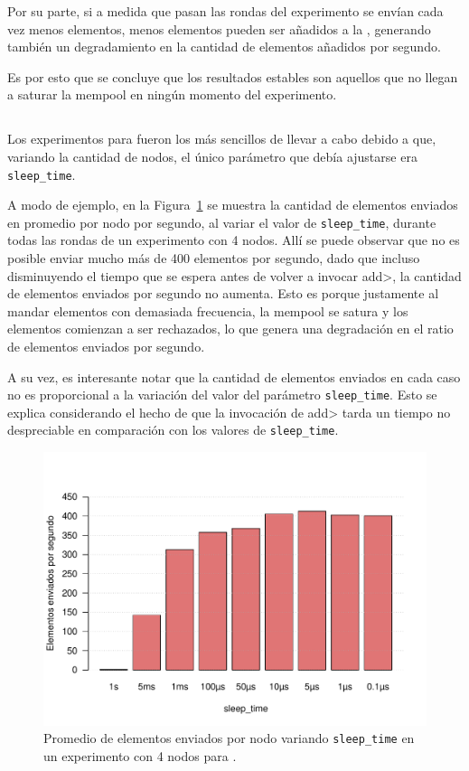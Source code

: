 Por su parte, si a medida que pasan las rondas del experimento se envían cada vez menos elementos, menos elementos pueden ser
añadidos a la \setchain, generando también un degradamiento en la cantidad de elementos añadidos por segundo.

Es por esto que se concluye que los resultados estables son aquellos que no llegan a saturar la mempool en ningún momento del
experimento.

\subsection{\vanilla}
Los experimentos para \vanilla fueron los más sencillos de llevar a cabo debido a que, variando la cantidad de nodos,
el único parámetro que debía ajustarse era \texttt{sleep\_time}.

A modo de ejemplo, en la Figura~\ref{fig:elements_against_sleep_time} se muestra la cantidad de elementos enviados en promedio por nodo por segundo,
al variar el valor de \texttt{sleep\_time}, durante todas las rondas de un experimento con 4 nodos.
Allí se puede observar que no es posible enviar mucho más de 400 elementos por segundo, dado que incluso disminuyendo el tiempo
que se espera antes de volver a invocar \<add>, la cantidad de elementos enviados por segundo no aumenta.
Esto es porque justamente al mandar elementos con demasiada frecuencia, la mempool se satura y los elementos comienzan a ser
rechazados, lo que genera una degradación en el ratio de elementos enviados por segundo.

A su vez, es interesante notar que la cantidad de elementos enviados en cada caso no es proporcional a la variación del valor del
parámetro \texttt{sleep\_time}.
Esto se explica considerando el hecho de que la invocación de \<add> tarda un tiempo no despreciable en comparación con
los valores de \texttt{sleep\_time}.

\begin{figure}
	\centering
	\includegraphics[scale=0.7]{figures/vanilla_4_nodos_elementos_enviados_segun_sleep.pdf}
	\caption{Promedio de elementos enviados por nodo variando \texttt{sleep\_time} en un experimento con 4 nodos para \vanilla.}
	\label{fig:elements_against_sleep_time}
\end{figure}

